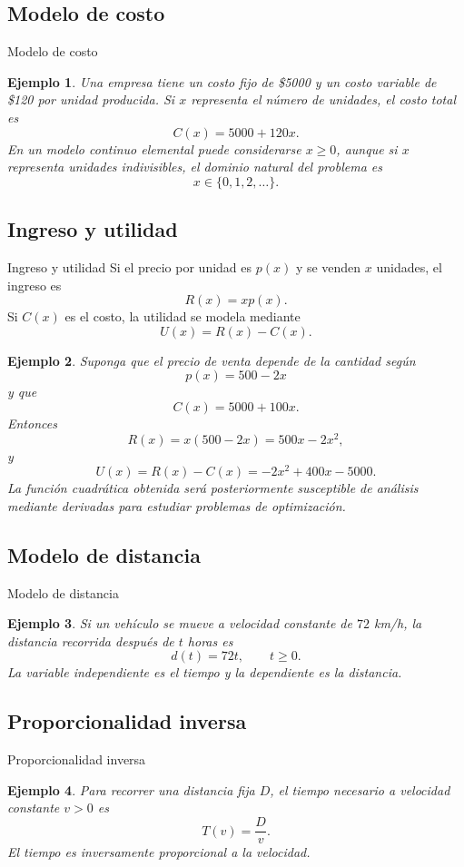 \documentclass[aspectratio=169,10pt]{beamer}
\newtheorem{ejemplo}{Ejemplo}
\begin{document}
\subsection*{Modelo de costo}
\begin{frame}{Modelo de costo}
\begin{ejemplo}
Una empresa tiene un costo fijo de \$5000 y un costo variable de \$120 por
unidad producida. Si $x$ representa el número de unidades, el costo total es
\[
C(x)=5000+120x.
\]
En un modelo continuo elemental puede considerarse $x\geq0$, aunque si $x$
representa unidades indivisibles, el dominio natural del problema es
\[
x\in\{0,1,2,\ldots\}.
\]
\end{ejemplo}
\end{frame}
\subsection*{Ingreso y utilidad}
\begin{frame}{Ingreso y utilidad}
Si el precio por unidad es $p(x)$ y se venden $x$ unidades, el ingreso es
\[
R(x)=xp(x).
\]
Si $C(x)$ es el costo, la utilidad se modela mediante
\[
U(x)=R(x)-C(x).
\]

\begin{ejemplo}
Suponga que el precio de venta depende de la cantidad según
\[
p(x)=500-2x
\]
y que
\[
C(x)=5000+100x.
\]
Entonces
\[
R(x)=x(500-2x)=500x-2x^2,
\]
y
\[
U(x)=R(x)-C(x)
=-2x^2+400x-5000.
\]
La función cuadrática obtenida será posteriormente susceptible de análisis
mediante derivadas para estudiar problemas de optimización.
\end{ejemplo}
\end{frame}
\subsection*{Modelo de distancia}
\begin{frame}{Modelo de distancia}
\begin{ejemplo}
Si un vehículo se mueve a velocidad constante de $72$ km/h, la distancia
recorrida después de $t$ horas es
\[
d(t)=72t,\qquad t\geq0.
\]
La variable independiente es el tiempo y la dependiente es la distancia.
\end{ejemplo}
\end{frame}
\subsection*{Proporcionalidad inversa}
\begin{frame}{Proporcionalidad inversa}
\begin{ejemplo}
Para recorrer una distancia fija $D$, el tiempo necesario a velocidad constante
$v>0$ es
\[
T(v)=\frac{D}{v}.
\]
El tiempo es inversamente proporcional a la velocidad.
\end{ejemplo}
\end{frame}
\end{document}
